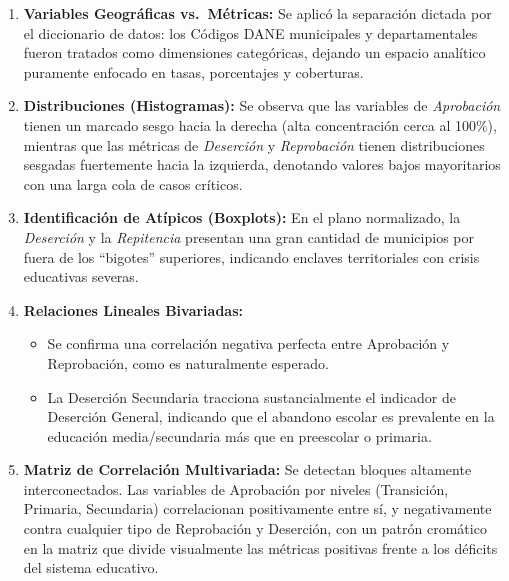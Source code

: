 \documentclass[
]{article}
\providecommand{\tightlist}{%
  \setlength{\itemsep}{0pt}\setlength{\parskip}{0pt}}
\begin{document}
\begin{enumerate}
\def\labelenumi{\arabic{enumi}.}
\tightlist
\item
  \textbf{Variables Geográficas vs.~Métricas:} Se aplicó la separación
  dictada por el diccionario de datos: los Códigos DANE municipales y
  departamentales fueron tratados como dimensiones categóricas, dejando
  un espacio analítico puramente enfocado en tasas, porcentajes y
  coberturas.
\item
  \textbf{Distribuciones (Histogramas):} Se observa que las variables de
  \emph{Aprobación} tienen un marcado sesgo hacia la derecha (alta
  concentración cerca al 100\%), mientras que las métricas de
  \emph{Deserción} y \emph{Reprobación} tienen distribuciones sesgadas
  fuertemente hacia la izquierda, denotando valores bajos mayoritarios
  con una larga cola de casos críticos.
\item
  \textbf{Identificación de Atípicos (Boxplots):} En el plano
  normalizado, la \emph{Deserción} y la \emph{Repitencia} presentan una
  gran cantidad de municipios por fuera de los ``bigotes'' superiores,
  indicando enclaves territoriales con crisis educativas severas.
\item
  \textbf{Relaciones Lineales Bivariadas:}

  \begin{itemize}
  \tightlist
  \item
    Se confirma una correlación negativa perfecta entre Aprobación y
    Reprobación, como es naturalmente esperado.
  \item
    La Deserción Secundaria tracciona sustancialmente el indicador de
    Deserción General, indicando que el abandono escolar es prevalente
    en la educación media/secundaria más que en preescolar o primaria.
  \end{itemize}
\item
  \textbf{Matriz de Correlación Multivariada:} Se detectan bloques
  altamente interconectados. Las variables de Aprobación por niveles
  (Transición, Primaria, Secundaria) correlacionan positivamente entre
  sí, y negativamente contra cualquier tipo de Reprobación y Deserción,
  con un patrón cromático en la matriz que divide visualmente las
  métricas positivas frente a los déficits del sistema educativo.
\end{enumerate}
\end{document}
